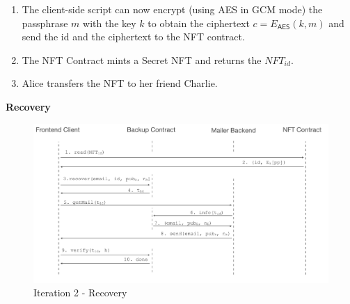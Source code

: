 \documentclass[runningheads]{llncs}
\newcommand{\ms}[1]{\ensuremath{\mathsf{#1}}}
\begin{document}
\begin{enumerate}
\item The client-side script can now encrypt (using AES in GCM mode) the passphrase $m$ with the key $k$ to obtain the ciphertext $c=E_{\ms{AES}}(k, m)$ and send the id and the ciphertext to the NFT contract.  
\item The NFT Contract mints a Secret NFT and returns the $NFT_{id}$.
\item Alice transfers the NFT to her friend Charlie. 
\end{enumerate}

{\bf Recovery}

\begin{figure}[t]
  \includegraphics[width=\linewidth]{./media/media-004.png}
  \caption{Iteration 2 - Recovery}
  \label{it2:recovery}
\end{figure}
\end{document}
